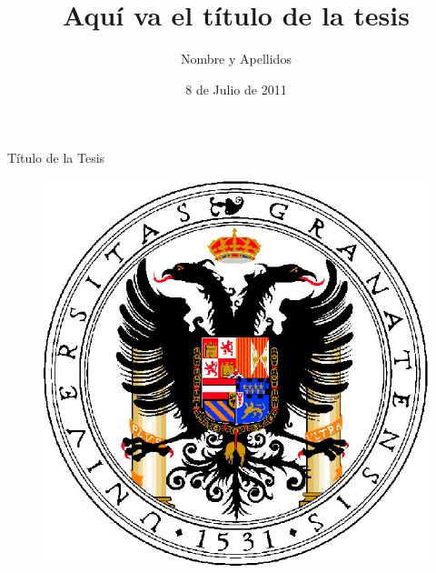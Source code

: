 \documentclass[b5paper,twoside,10pt]{book}
\date{8 de Julio de 2011}
\title{Aquí va el título de la tesis}
\author{Nombre y Apellidos}
\begin{document}


\frontmatter

\renewcommand{\labelitemi}{$\bullet$}
\renewcommand{\labelitemii}{---}
\renewcommand{\labelitemiii}{--}


\pagestyle{empty}
\begin{center}
\LARGE
Título de la Tesis
\end{center}
\vspace{20ex}
\begin{figure}[h]
\centering
\includegraphics[width=.5\textwidth]{escudo_ugr_portada}
\end{figure}
\vspace{25ex}
\end{document}
